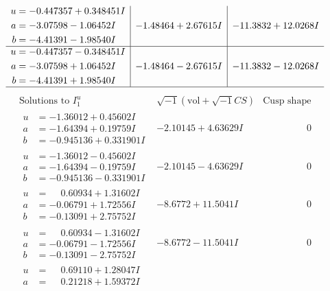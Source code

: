 \documentclass[1p]{elsarticle_modified}
\theoremstyle{definition}
\newcommand{\I}{\sqrt{-1}}
\begin{document}
$$\begin{array}{c|c|c}
\begin{aligned}
u &= -0.447357 + 0.348451 I \\
a &= -3.07598 - 1.06452 I \\
b &= -4.41391 - 1.98540 I\end{aligned}
 & -1.48464 + 2.67615 I & -11.3832 + 12.0268 I \\ \hline\begin{aligned}
u &= -0.447357 - 0.348451 I \\
a &= -3.07598 + 1.06452 I \\
b &= -4.41391 + 1.98540 I\end{aligned}
 & -1.48464 - 2.67615 I & -11.3832 - 12.0268 I\\
 \hline 
 \end{array}$$\newpage$$\begin{array}{c|c|c}  
\text{Solutions to }I^u_{1}& \I (\text{vol} + \sqrt{-1}CS) & \text{Cusp shape}\\
 \hline 
\begin{aligned}
u &= -1.36012 + 0.45602 I \\
a &= -1.64394 + 0.19759 I \\
b &= -0.945136 + 0.331901 I\end{aligned}
 & -2.10145 + 4.63629 I & \phantom{-0.000000 } 0 \\ \hline\begin{aligned}
u &= -1.36012 - 0.45602 I \\
a &= -1.64394 - 0.19759 I \\
b &= -0.945136 - 0.331901 I\end{aligned}
 & -2.10145 - 4.63629 I & \phantom{-0.000000 } 0 \\ \hline\begin{aligned}
u &= \phantom{-}0.60934 + 1.31602 I \\
a &= -0.06791 + 1.72556 I \\
b &= -0.13091 + 2.75752 I\end{aligned}
 & -8.6772 + 11.5041 I & \phantom{-0.000000 } 0 \\ \hline\begin{aligned}
u &= \phantom{-}0.60934 - 1.31602 I \\
a &= -0.06791 - 1.72556 I \\
b &= -0.13091 - 2.75752 I\end{aligned}
 & -8.6772 - 11.5041 I & \phantom{-0.000000 } 0 \\ \hline\begin{aligned}
u &= \phantom{-}0.69110 + 1.28047 I \\
a &= \phantom{-}0.21218 + 1.59372 I \\

\end{aligned}
\end{array}$$
\end{document}
